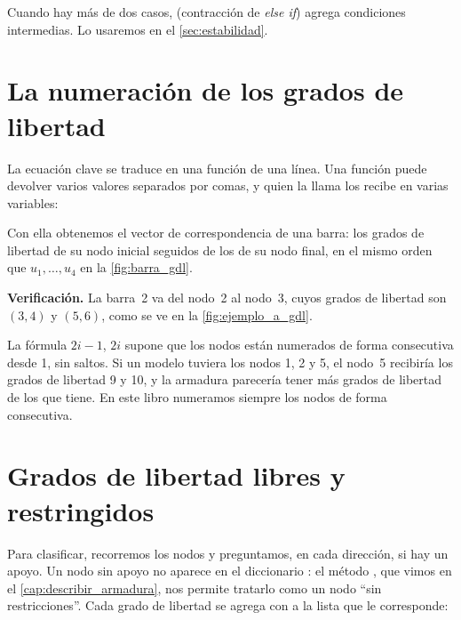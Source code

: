 Cuando hay más de dos casos,  (contracción de \emph{else if})
agrega condiciones intermedias. Lo usaremos en el \cref{sec:estabilidad}.

\section{La numeración de los grados de libertad}\label{sec:numeracion}

La ecuación clave se traduce en una función de una línea. Una función puede
devolver varios valores separados por comas, y quien la llama los recibe en
varias variables:

Con ella obtenemos el vector de correspondencia de una barra: los grados de
libertad de su nodo inicial seguidos de los de su nodo final, en el mismo
orden que $u_1, \dots, u_4$ en la \cref{fig:barra_gdl}.

\textbf{Verificación.} La barra~2 va del nodo~2 al nodo~3, cuyos grados de
libertad son $(3, 4)$ y $(5, 6)$, como se ve en la \cref{fig:ejemplo_a_gdl}.

\begin{cuidado}
La fórmula $2i-1$, $2i$ supone que los nodos están numerados de forma
consecutiva desde 1, sin saltos. Si un modelo tuviera los nodos 1, 2 y 5, el
nodo~5 recibiría los grados de libertad 9 y 10, y la armadura parecería
tener más grados de libertad de los que tiene. En este libro numeramos
siempre los nodos de forma consecutiva.
\end{cuidado}

\section{Grados de libertad libres y restringidos}\label{sec:libres_restringidos}

Para clasificar, recorremos los nodos y preguntamos, en cada dirección, si
hay un apoyo. Un nodo sin apoyo no aparece en el diccionario :
el método , que vimos en el \cref{cap:describir_armadura}, nos
permite tratarlo como un nodo \enquote{sin restricciones}. Cada grado de
libertad se agrega con  a la lista que le corresponde:

